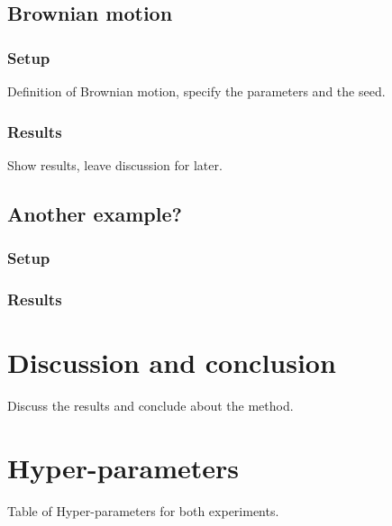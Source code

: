 \documentclass{article}
\begin{document}
\subsection{Brownian motion}
\subsubsection{Setup}
Definition of Brownian motion, specify the parameters and the seed. 

\subsubsection{Results}
Show results, leave discussion for later.

\subsection{Another example?}
\subsubsection{Setup}
\subsubsection{Results}

\section{Discussion and conclusion}
Discuss the results and conclude about the method. 

\appendix
\section{Hyper-parameters}
Table of Hyper-parameters for both experiments. 


 

 

 

 


 
\end{document}
